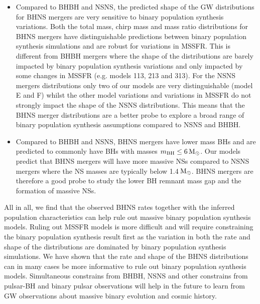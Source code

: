 \documentclass[twocolumn]{aastex63}
\newcommand\bhnsSingle{BHNS\xspace}
\newcommand{\Msun}{\ensuremath{\,\rm{M}_{\odot}}\xspace}
\newcommand{\mbhf}{\ensuremath{m_{\rm{BH}}}\xspace}
\begin{document}
\begin{itemize}
\item Compared to BHBH and NSNS, the predicted shape of the \ac{GW} distributions for \bhnsSingle mergers are very sensitive to binary population synthesis variations. Both the total mass,  chirp mass and mass ratio distributions for \bhnsSingle mergers have distinguishable predictions between binary population synthesis simulations and are robust for variations in \ac{MSSFR}. This is different from BHBH mergers where the shape of the distributions are barely impacted by binary population synthesis variations and only impacted by some changes in \ac{MSSFR} (e.g. models 113, 213 and 313). For the NSNS mergers distributions only two of our models are very distinguishable (model E and F) whilst the  other model variations and variations in \ac{MSSFR} do not strongly impact the shape of the NSNS distributions. This means that the \bhnsSingle merger distributions are a better probe to explore a broad range of binary population synthesis assumptions compared to NSNS and BHBH. 


\item Compared to BHBH and NSNS, \bhnsSingle mergers have lower mass \acp{BH} and are predicted to commonly have \acp{BH} with masses $\mbhf \leq 6 \Msun$. Our models predict that \bhnsSingle mergers will have more massive \acp{NS} compared to NSNS mergers where the NS masses are typically below 1.4\Msun. \bhnsSingle mergers are therefore a good probe to study the lower \ac{BH} remnant mass gap and the formation of massive \acp{NS}. 

\end{itemize}




All in all, we find that the observed \bhnsSingle rates together with the inferred population characteristics can help rule out massive binary population synthesis models. Ruling out \ac{MSSFR} models is more difficult and will require constraining the binary population synthesis result first as the variation in both the rate and shape of the distributions are dominated by binary population synthesis simulations.  We have shown that the rate and shape of the \bhnsSingle distributions can in many cases be more informative to rule out binary population synthesis models.  Simultaneous constrains from BHBH, \ac{NSNS} and other constrains from pulsar-BH and binary pulsar observations will help in the future to learn from \ac{GW} observations about massive binary evolution and cosmic history. 
\end{document}
